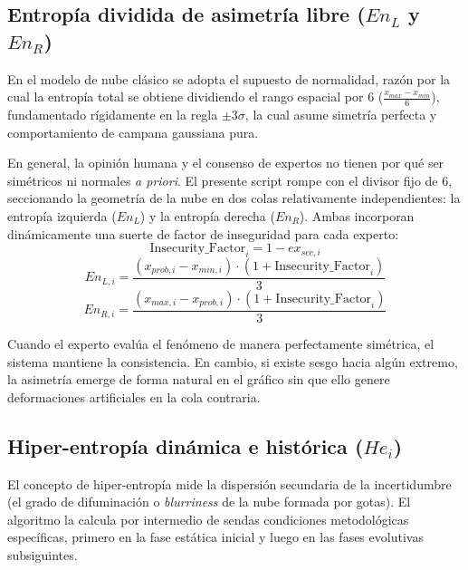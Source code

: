 \documentclass[11pt,a4paper]{article}
\begin{document}
\subsection{Entropía dividida de asimetría libre \texorpdfstring{($En_L$ y $En_R$)}{En\_L y En\_R}}
En el modelo de nube clásico se adopta el supuesto de normalidad, razón por la cual la entropía total se obtiene dividiendo el rango espacial por $6$ ($\frac{x_{max} - x_{min}}{6}$), fundamentado rígidamente en la regla $\pm3\sigma$, la cual asume simetría perfecta y comportamiento de campana gaussiana pura. 

En general, la opinión humana y el consenso de expertos no tienen por qué ser simétricos ni normales \textit{a priori}. El presente script rompe con el divisor fijo de 6, seccionando la geometría de la nube en dos colas relativamente independientes: la entropía izquierda ($En_L$) y la entropía derecha ($En_R$). Ambas incorporan dinámicamente una suerte de factor de inseguridad para cada experto:
\begin{equation}
    \text{Insecurity\_Factor}_i = 1 - ex_{sec,i}
\end{equation}
\begin{equation}
    En_{L,i} = \frac{(x_{prob,i} - x_{min,i}) \cdot (1 + \text{Insecurity\_Factor}_i)}{3}
\end{equation}
\begin{equation}
    En_{R,i} = \frac{(x_{max,i} - x_{prob,i}) \cdot (1 + \text{Insecurity\_Factor}_i)}{3}
\end{equation}

Cuando el experto evalúa el fenómeno de manera perfectamente simétrica, el sistema mantiene la consistencia. En cambio, si existe sesgo hacia algún extremo, la asimetría emerge de forma natural en el gráfico sin que ello genere deformaciones artificiales en la cola contraria.

\subsection{Hiper-entropía dinámica e histórica \texorpdfstring{($He_i$)}{He\_i}}
El concepto de hiper-entropía mide la dispersión secundaria de la incertidumbre (el grado de difuminación o \textit{blurriness} de la nube formada por gotas). El algoritmo la calcula por intermedio de sendas condiciones metodológicas específicas, primero en la fase estática inicial y luego en las fases evolutivas subsiguintes.
\end{document}
